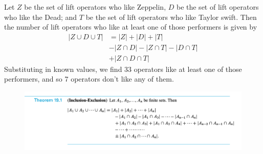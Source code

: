 \documentclass[10pt]{beamer}
\begin{document}
\begin{frame}
\footnotesize 

\begin{mygreenbox}[title=Formulaic solution]
Let $Z$ be the set of lift operators who like Zeppelin, $D$ be the set of lift operators who like the Dead; and $T$ be the set of
lift operators who like Taylor swift. Then the number of lift operators who like at least one of those performers is given by
%
\begin{align*}
| Z \cup D \cup T | &= |Z| + |D| + |T| \\
& -|Z \cap D| - |Z \cap T | - |D \cap T| \\
& + |Z \cap D \cap T|
\end{align*}
Substituting in known values, we find 33 operators like at least one of those performers, and so 7 operators don't like any of them.

\end{mygreenbox}

\vfill \pause 
\begin{myredbox}[title=General formula]

\begin{figure}
\includegraphics[width=\textwidth]{images/inclusion_exclusion.png}
\end{figure}
\end{myredbox}

\end{frame}
\end{document}
